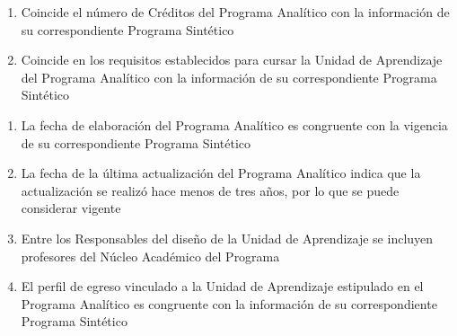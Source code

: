 \documentclass{article}
\begin{document}
\begin{Form}
\begin{enumerate}[leftmargin=*,nolistsep]
\item{Coincide el n\'{u}mero de Cr\'{e}ditos del Programa
  Anal\'{i}tico con la informaci\'{o}n de su correspondiente Programa
  Sint\'{e}tico \begin{flushright}
  \quad
\end{flushright}
}

\item{Coincide en los requisitos establecidos para cursar la Unidad de
  Aprendizaje del Programa Anal\'{i}tico con la informaci\'{o}n de su
  correspondiente Programa Sint\'{e}tico
  \begin{flushright}%
    \quad%
    \end{flushright}}

\end{enumerate}

\newpage

\begin{enumerate}[resume,leftmargin=*,nolistsep]

\item{La fecha de elaboraci\'{o}n del Programa Anal\'{i}tico es
  congruente con la vigencia de su correspondiente Programa
  Sint\'{e}tico \begin{flushright}
  \quad
\end{flushright}
}

\item{La fecha de la \'{u}ltima actualizaci\'{o}n del Programa
  Anal\'{i}tico indica que la actualizaci\'{o}n se realiz\'{o} hace
  menos de tres a\~{n}os, por lo que se puede considerar vigente
    \hfill {}%
  \quad%
  }

\item{Entre los Responsables del dise\~{n}o de la Unidad de
  Aprendizaje se incluyen profesores del N\'{u}cleo Acad\'{e}mico del
  Programa \begin{flushright}
  \quad
\end{flushright}
}

\item{El perfil de egreso vinculado a la Unidad de Aprendizaje
  estipulado en el Programa Anal\'{i}tico es congruente con la
  informaci\'{o}n de su correspondiente Programa Sint\'{e}tico   \hfill {}%
  \quad%
  }


\end{enumerate}
\end{Form}
\end{document}
